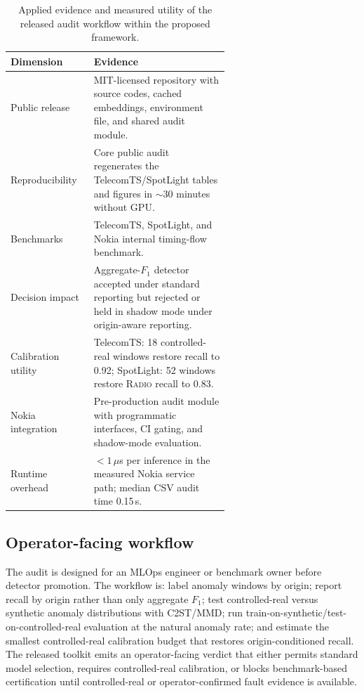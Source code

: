 \documentclass[sigconf,review]{acmart}
\begin{document}
\begin{table}[t]
  \caption{Applied evidence and measured utility of the released audit workflow within the proposed framework.}
  \label{tab:release}
  \footnotesize
  \setlength{\tabcolsep}{3pt}
  \begin{tabular}{@{}lp{0.62\linewidth}@{}}
    \toprule
    \textbf{Dimension} & \textbf{Evidence} \\
    \midrule
    Public release &
    MIT-licensed repository with source codes, cached embeddings, environment file, and shared audit module. \\
    Reproducibility &
    Core public audit regenerates the TelecomTS/SpotLight tables and figures in ${\sim}30$ minutes without GPU. \\
    Benchmarks &
    TelecomTS, SpotLight, and Nokia internal timing-flow benchmark. \\
    Decision impact &
    Aggregate-$F_1$ detector accepted under standard reporting but rejected or held in shadow mode under origin-aware reporting. \\
    Calibration utility &
    TelecomTS: 18 controlled-real windows restore recall to 0.92; SpotLight: 52 windows restore \textsc{Radio} recall to 0.83. \\
    Nokia integration &
    Pre-production audit module with programmatic interfaces, CI gating, and shadow-mode evaluation. \\
    Runtime overhead &
    $<1\,\mu$s per inference in the measured Nokia service path; median CSV audit time 0.15\,s. \\
    \bottomrule
  \end{tabular}
\end{table}

\subsection{Operator-facing workflow}
The audit is designed for an MLOps engineer or benchmark owner before detector promotion. The workflow is: label anomaly windows by origin; report recall by origin rather than only aggregate $F_1$; test controlled-real versus synthetic anomaly distributions with C2ST/MMD; run train-on-synthetic/test-on-controlled-real evaluation at the natural anomaly rate; and estimate the smallest controlled-real calibration budget that restores origin-conditioned recall. The released toolkit emits an operator-facing verdict that either permits standard model selection, requires controlled-real calibration, or blocks benchmark-based certification until controlled-real or operator-confirmed fault evidence is available.
\end{document}
